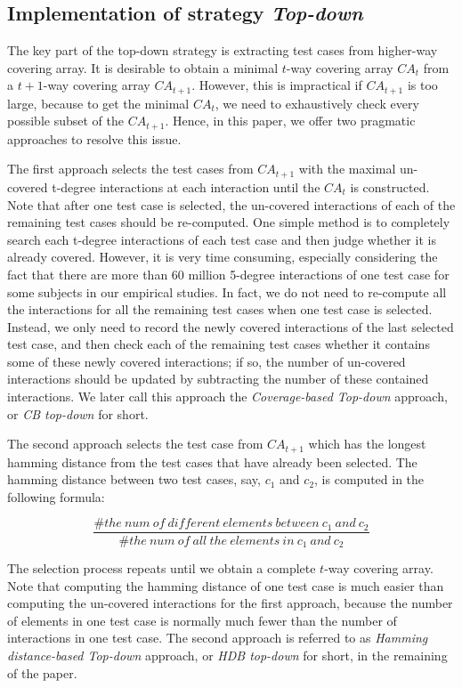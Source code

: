 \documentclass[conference]{IEEEtran}
\theoremstyle{definition}
\begin{document}
\subsection{Implementation of strategy \emph{Top-down}}
The key part of the top-down strategy is extracting test cases from higher-way covering array. It is desirable to obtain a minimal $t$-way covering array $CA_{t}$  from a $t+1$-way covering array $CA_{t+1}$. However, this is impractical if $CA_{t+1}$ is too large, because to get the minimal $CA_{t}$, we need to exhaustively check every possible subset of the $CA_{t+1}$. Hence, in this paper, we offer two pragmatic approaches to resolve this issue.

The first approach selects the test cases from $CA_{t+1}$ with the maximal un-covered t-degree interactions at each interaction until the $CA_{t}$ is constructed. Note that after one test case is selected, the un-covered interactions of each of the remaining test cases should be re-computed. One simple method is to completely search each t-degree interactions of each test case and then judge whether it is already covered. However, it is very time consuming, especially considering the fact that there are more than 60 million 5-degree interactions of one test case for some subjects in our empirical studies. In fact, we do not need to re-compute all the interactions for all the remaining test cases when one test case is selected. Instead, we only need to record the newly covered interactions of the last selected test case, and then check each of the remaining test cases whether it contains some of these newly covered interactions; if so, the  number of un-covered interactions should be updated by subtracting the number of these contained interactions. We later call this approach the \emph{Coverage-based Top-down} approach, or \emph{CB top-down} for short.

The second approach selects the test case from $CA_{t+1}$ which has the longest hamming distance from the test cases that have already been selected.  The hamming distance between two test cases, say, $c_{1}$ and $c_{2}$, is computed in the following formula:

$$ \frac{\#the\ num\ of\ different\ elements\ between\ c_{1}\ and\ c_{2}}{\#the\ num\ of\ all\ the\ elements\ in\ c_{1}\ and\ c_{2}} $$

The selection process repeats until we obtain a complete $t$-way covering array. Note that computing the hamming distance of one test case is much easier than computing the un-covered interactions for the first approach, because the number of elements in one test case is normally much fewer than the number of interactions in one test case. The second approach is referred to as \emph{Hamming distance-based Top-down} approach, or \emph{HDB top-down} for short, in the remaining of the paper.
\end{document}
